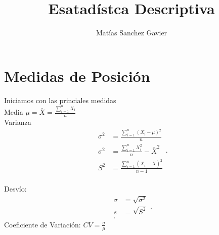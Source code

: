 \documentclass[12pt]{article}
\title{Esatadístca Descriptiva}
\author{Matías Sanchez Gavier}
\makeatletter
\renewcommand{\maketitle}{\bgroup\setlength{\parindent}{0pt}
\begin{flushleft}
  {\Huge\sffamily\bfseries\@title}
  \vskip 1.5em
  {\sffamily\@author}
\end{flushleft}\egroup
}
\makeatother
\begin{document}
\maketitle

\section{Medidas de Posición}
Iniciamos con las princiales medidas\\ [0.2cm] 
Media $\mu = \overline{X} = \frac{\sum_{i=1}^{n} X_i}{n}$ \\ [0.2cm]  
Varianza 
\[
 \begin{align*}
  \sigma^{2}  &=  \frac{\sum_{i=1}^{n} (X_i -  \mu )^{2}}{n} \\[0.2cm]  
   \sigma^{2} &= \frac{\sum_{i=1}^{n}X_i^{2}}{n}  -  \overline{X}^{2} \\[0.2cm]  
  S^{2} &=  \frac{\sum_{i=1}^{n} (X_i - \overline{X})^{2}}{n-1}   
  \end{align*}   .\] \\[0.2cm]  

Desvío: 
\[
\begin{align*}
\sigma &=   \sqrt{\sigma^{2}} \\
s &= \sqrt{S^{2}}  \\
.\end{align*}
.\] 
Coeficiente de Variación: $CV= \frac{\sigma}{\mu}$
\end{document}
